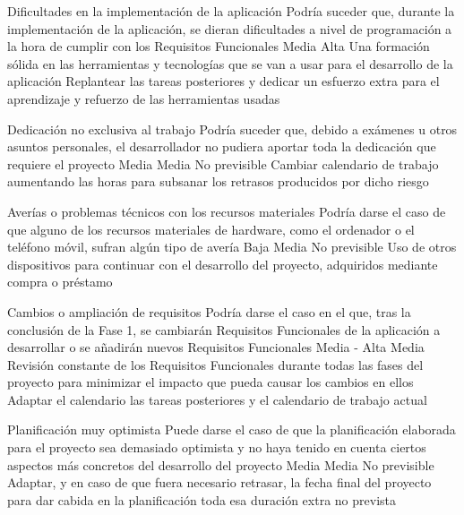 \riskframe
	{Dificultades en la implementación de la aplicación}
	{Podría suceder que, durante la implementación de la aplicación, se dieran dificultades a nivel de programación a la hora de cumplir con los Requisitos Funcionales}
	{Media}
	{Alta}
	{Una formación sólida en las herramientas y tecnologías que se van a usar para el desarrollo de la aplicación}
	{Replantear las tareas posteriores y dedicar un esfuerzo extra para el aprendizaje y refuerzo de las herramientas usadas}

\riskframe
	{Dedicación no exclusiva al trabajo}
	{Podría suceder que, debido a exámenes u otros asuntos personales, el desarrollador no pudiera aportar toda la dedicación que requiere el proyecto}
	{Media}
	{Media}
	{No previsible}
	{Cambiar calendario de trabajo aumentando las horas para subsanar los retrasos producidos por dicho riesgo}

\riskframe
	{Averías o problemas técnicos con los recursos materiales}
	{Podría darse el caso de que alguno de los recursos materiales de hardware, como el ordenador o el teléfono móvil, sufran algún tipo de avería}
	{Baja}
	{Media}
	{No previsible}
	{Uso de otros dispositivos para continuar con el desarrollo del proyecto, adquiridos mediante compra o préstamo}

\riskframe
	{Cambios o ampliación de requisitos}
	{Podría darse el caso en el que, tras la conclusión de la Fase 1, se cambiarán Requisitos Funcionales de la aplicación a desarrollar o se añadirán nuevos Requisitos Funcionales}
	{Media - Alta}
	{Media}
	{Revisión constante de los Requisitos Funcionales durante todas las fases del proyecto para minimizar el impacto que pueda causar los cambios en ellos}
	{Adaptar el calendario las tareas posteriores y el calendario de trabajo actual}

\riskframe
	{Planificación muy optimista}
	{Puede darse el caso de que la planificación elaborada para el proyecto sea demasiado optimista y no haya tenido en cuenta ciertos aspectos más concretos del desarrollo del proyecto}
	{Media}
	{Media}
	{No previsible}
	{Adaptar, y en caso de que fuera necesario retrasar, la fecha final del proyecto para dar cabida en la planificación toda  esa duración extra no prevista}